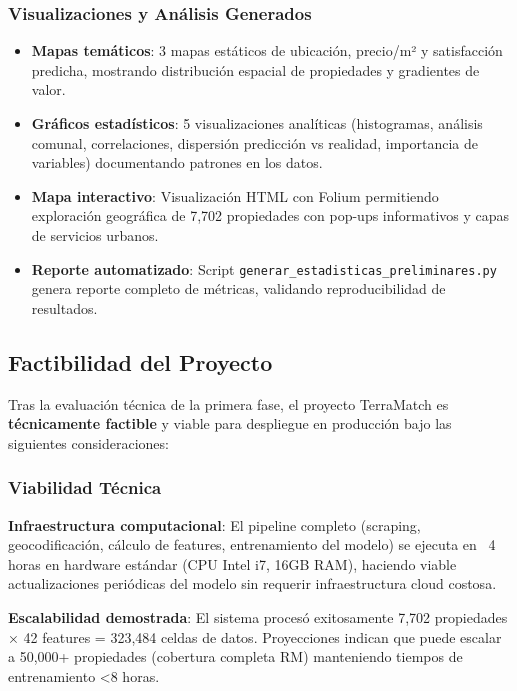 \subsubsection{Visualizaciones y Análisis Generados}

\begin{itemize}
    \item \textbf{Mapas temáticos}: 3 mapas estáticos de ubicación, precio/m² y satisfacción predicha, mostrando distribución espacial de propiedades y gradientes de valor.
    
    \item \textbf{Gráficos estadísticos}: 5 visualizaciones analíticas (histogramas, análisis comunal, correlaciones, dispersión predicción vs realidad, importancia de variables) documentando patrones en los datos.
    
    \item \textbf{Mapa interactivo}: Visualización HTML con Folium permitiendo exploración geográfica de 7,702 propiedades con pop-ups informativos y capas de servicios urbanos.
    
    \item \textbf{Reporte automatizado}: Script \texttt{generar\_estadisticas\_preliminares.py} genera reporte completo de métricas, validando reproducibilidad de resultados.
\end{itemize}

\subsection{Factibilidad del Proyecto}

Tras la evaluación técnica de la primera fase, el proyecto TerraMatch es \textbf{técnicamente factible} y viable para despliegue en producción bajo las siguientes consideraciones:

\subsubsection{Viabilidad Técnica}

\textbf{Infraestructura computacional}: El pipeline completo (scraping, geocodificación, cálculo de features, entrenamiento del modelo) se ejecuta en ~4 horas en hardware estándar (CPU Intel i7, 16GB RAM), haciendo viable actualizaciones periódicas del modelo sin requerir infraestructura cloud costosa.

\textbf{Escalabilidad demostrada}: El sistema procesó exitosamente 7,702 propiedades × 42 features = 323,484 celdas de datos. Proyecciones indican que puede escalar a 50,000+ propiedades (cobertura completa RM) manteniendo tiempos de entrenamiento <8 horas.

